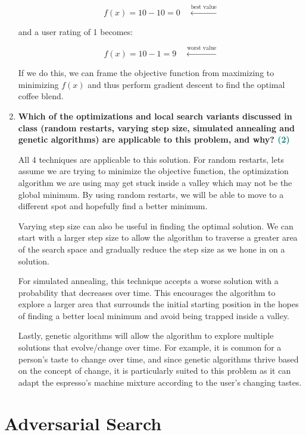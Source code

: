 \documentclass[a4paper]{article}
\begin{document}
\begin{sloppypar}
\begin{enumerate}[start=9,label=Q\arabic*,left=0pt]
    \[ f(x) = 10 - 10 = 0 \quad \xleftarrow{\text{best value}} \]

    and a user rating of 1 becomes:

    \[ f(x) = 10 - 1 = 9 \quad \xleftarrow{\text{worst value}} \]

    If we do this, we can frame the objective function from maximizing to minimizing $f(x)$ and thus perform gradient descent
    to find the optimal coffee blend.

    \item \textbf{Which of the optimizations and local search variants discussed in class (random restarts, varying step size, simulated annealing and genetic algorithms) are applicable to this problem, and why? \hfill \textcolor{teal}{(2)}}
    
    \par All 4 techniques are applicable to this solution. For random restarts, lets assume we are trying to minimize the objective
    function, the optimization algorithm we are using may get stuck inside a valley which may not be the global minimum. By using random
    restarts, we will be able to move to a different spot and hopefully find a better minimum.

    Varying step size can also be useful in finding the optimal solution. We can start with a larger step size to allow the algorithm
    to traverse a greater area of the search space and gradually reduce the step size as we hone in on a solution. 

    For simulated annealing, this technique accepts a worse solution with a probability that decreases over time. This encourages the algorithm
    to explore a larger area that surrounds the initial starting position in the hopes of finding a better local minimum and avoid being trapped
    inside a valley. 

    Lastly, genetic algorithms will allow the algorithm to explore multiple solutions that evolve/change over time. For example,
    it is common for a person's taste to change over time, and since genetic algorithms thrive based on the concept of change, it is particularly suited
    to this problem as it can adapt the espresso's machine mixture according to the user's changing tastes.
\end{enumerate}

\section{Adversarial Search}


\end{sloppypar}
\end{document}
